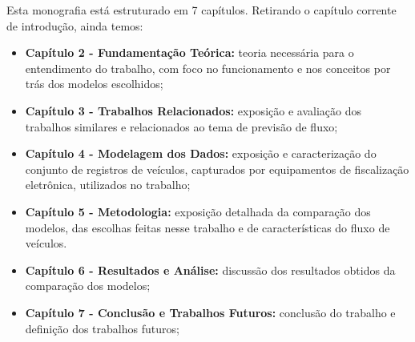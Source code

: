 Esta monografia está estruturado em 7 capítulos. Retirando o capítulo corrente de introdução, ainda temos:

\begin{itemize}
    \item \textbf{Capítulo 2 - Fundamentação Teórica:} teoria necessária para o entendimento do trabalho, com foco no funcionamento e nos conceitos por trás dos modelos escolhidos;
    \item \textbf{Capítulo 3 - Trabalhos Relacionados:} exposição e avaliação dos trabalhos similares e relacionados ao tema de previsão de fluxo;
    \item \textbf{Capítulo 4 - Modelagem dos Dados:} exposição e caracterização do conjunto de registros de veículos, capturados por equipamentos de fiscalização eletrônica, utilizados no trabalho;
    \item \textbf{Capítulo 5 - Metodologia:} exposição detalhada da comparação dos modelos, das escolhas feitas nesse trabalho e de características do fluxo de veículos.
    \item \textbf{Capítulo 6 - Resultados e Análise:} discussão dos resultados obtidos da comparação dos modelos;
    \item \textbf{Capítulo 7 - Conclusão e Trabalhos Futuros:} conclusão do trabalho e definição dos trabalhos futuros;
\end{itemize}
